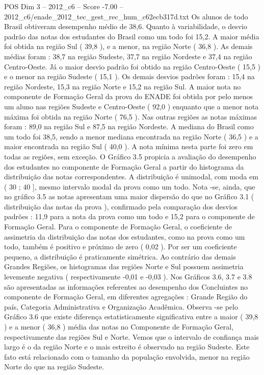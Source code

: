\begin{textsample}{POS Dim 3 – 2012\_c6 – Score -7.00 – 2012\_c6/enade\_2012\_tec\_gest\_rec\_hum\_c62ecb317d.txt}
Os alunos de todo Brasil obtiveram desempenho médio de 38,6.
Quanto à variabilidade, o desvio padrão das notas dos estudantes do Brasil como um todo foi 15,2.
A maior média foi obtida na região Sul ( 39,8 ), e a menor, na região Norte ( 36,8 ).
As demais médias foram : 38,7 na região Sudeste, 37,7 na região Nordeste e 37,4 na região Centro-Oeste.
Já o maior desvio padrão foi obtido na região Centro-Oeste ( 15,5 ) e o menor na região Sudeste ( 15,1 ).
Os demais desvios padrões foram : 15,4 na região Nordeste, 15,3 na região Norte e 15,2 na região Sul.
A maior nota no componente de Formação Geral da prova do ENADE foi obtida por pelo menos um aluno nas regiões Sudeste e Centro-Oeste ( 92,0 ) enquanto que a menor nota máxima foi obtida na região Norte ( 76,5 ).
Nas outras regiões as notas máximas foram : 89,0 na região Sul e 87,5 na região Nordeste.
A mediana do Brasil como um todo foi 38,5, sendo a menor mediana encontrada na região Norte ( 36,5 ) e a maior encontrada na região Sul ( 40,0 ).
A nota mínima nesta parte foi zero em todas as regiões, sem exceção.
O Gráfico 3.5 propicia a avaliação do desempenho dos estudantes no componente de Formação Geral a partir do histograma da distribuição das notas correspondentes.
A distribuição é unimodal, com moda em ( 30 ; 40 ], mesmo intervalo modal da prova como um todo.
Nota -se, ainda, que no gráfico 3.5 as notas apresentam uma maior dispersão do que no Gráfico 3.1 ( distribuição das notas da prova ), confirmado pela comparação dos desvios padrões : 11,9 para a nota da prova como um todo e 15,2 para o componente de Formação Geral.
Para o componente de Formação Geral, o coeficiente de assimetria da distribuição das notas dos estudantes, como na prova como um todo, também é positivo e próximo de zero ( 0,02 ).
Por ser um coeficiente pequeno, a distribuição é praticamente simétrica.
Ao contrário das demais Grandes Regiões, os histogramas das regiões Norte e Sul possuem assimetria levemente negativa ( respectivamente -0,01 e -0,03 ).
Nos Gráficos 3.6, 3.7 e 3.8 são apresentadas as informações referentes ao desempenho dos Concluintes no componente de Formação Geral, em diferentes agregações : Grande Região do país, Categoria Administrativa e Organização Acadêmica.
Observa -se pelo Gráfico 3.6 que existe diferença estatisticamente significativa entre a maior ( 39,8 ) e a menor ( 36,8 ) média das notas no Componente de Formação Geral, respectivamente das regiões Sul e Norte.
Vemos que o intervalo de confiança mais largo é o da região Norte e o mais estreito é observado na região Sudeste.
Este fato está relacionado com o tamanho da população envolvida, menor na região Norte do que na região Sudeste.

\end{textsample}

